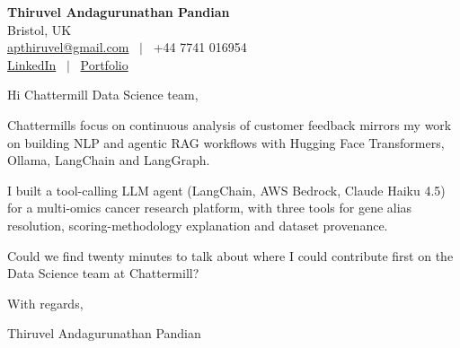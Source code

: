 \documentclass[11pt,a4paper]{article}
\begin{document}
\raggedright
\pagestyle{empty}

\begin{center}
    {\LARGE \color{linkblue} \textbf{Thiruvel Andagurunathan Pandian}}\\[0.2cm]
    Bristol, UK \\
    \href{mailto:apthiruvel@gmail.com}{apthiruvel@gmail.com} \ $|$ \ +44 7741 016954 \\
\href{https://www.linkedin.com/in/thiruvel-a-p/}{LinkedIn} \ $|$ \ \href{https://thiruvel-ap.github.io/PersonalPortfolio/}{Portfolio}
\end{center}

\vspace{0.4cm}

\noindent
Hi Chattermill Data Science team,

Chattermill\textquotesingle{}s focus on continuous analysis of customer feedback mirrors my work on building NLP and agentic RAG workflows with Hugging Face Transformers, Ollama, LangChain and LangGraph.

I built a tool-calling LLM agent (LangChain, AWS Bedrock, Claude Haiku 4.5) for a multi-omics cancer research platform, with three tools for gene alias resolution, scoring-methodology explanation and dataset provenance.

Could we find twenty minutes to talk about where I could contribute first on the Data Science team at Chattermill?

\vspace{0.5cm}

With regards,

Thiruvel Andagurunathan Pandian
\end{document}
